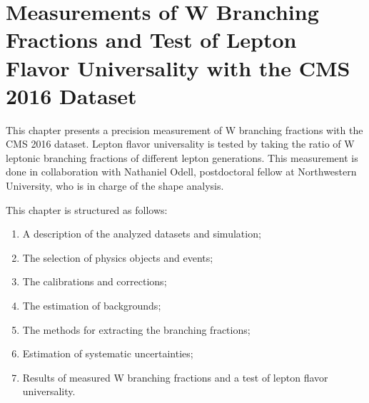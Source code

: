 \chapter{Measurements of W Branching Fractions and Test of Lepton Flavor Universality with the CMS 2016 Dataset}
\label{sec:analysis}


This chapter presents a precision measurement of W branching fractions with the CMS 2016 dataset. Lepton flavor universality is tested by taking the ratio of W leptonic branching fractions of different lepton generations. This measurement is done in collaboration with Nathaniel Odell, postdoctoral fellow at Northwestern University, who is in charge of the shape analysis. 


This chapter is structured as follows:

\begin{enumerate}
    \item A description of the analyzed datasets and simulation;
    \item The selection of physics objects and events;
    \item The calibrations and corrections;
    \item The estimation of backgrounds;
    \item The methods for extracting the branching fractions;
    \item Estimation of systematic uncertainties;
    \item Results of measured W branching fractions and a test of lepton flavor universality.
\end{enumerate}
    
    












